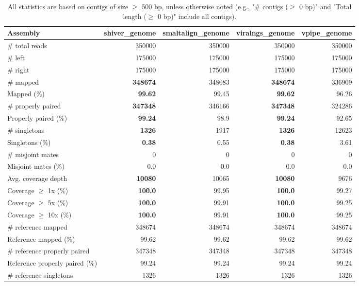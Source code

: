\documentclass[12pt,a4paper]{article}
\begin{document}
\begin{table}[ht]
\begin{center}
\caption{All statistics are based on contigs of size $\geq$ 500 bp, unless otherwise noted (e.g., "\# contigs ($\geq$ 0 bp)" and "Total length ($\geq$ 0 bp)" include all contigs).}
\begin{tabular}{|l*{4}{|r}|}
\hline
Assembly & shiver\_genome & smaltalign\_genome & viralngs\_genome & vpipe\_genome \\ \hline
\# total reads & 350000 & 350000 & 350000 & 350000 \\ \hline
\# left & 175000 & 175000 & 175000 & 175000 \\ \hline
\# right & 175000 & 175000 & 175000 & 175000 \\ \hline
\# mapped & {\bf 348674} & 348083 & {\bf 348674} & 336909 \\ \hline
Mapped (\%) & {\bf 99.62} & 99.45 & {\bf 99.62} & 96.26 \\ \hline
\# properly paired & {\bf 347348} & 346166 & {\bf 347348} & 324286 \\ \hline
Properly paired (\%) & {\bf 99.24} & 98.9 & {\bf 99.24} & 92.65 \\ \hline
\# singletons & {\bf 1326} & 1917 & {\bf 1326} & 12623 \\ \hline
Singletons (\%) & {\bf 0.38} & 0.55 & {\bf 0.38} & 3.61 \\ \hline
\# misjoint mates & 0 & 0 & 0 & 0 \\ \hline
Misjoint mates (\%) & 0.0 & 0.0 & 0.0 & 0.0 \\ \hline
Avg. coverage depth & {\bf 10080} & 10065 & {\bf 10080} & 9676 \\ \hline
Coverage $\geq$ 1x (\%) & {\bf 100.0} & 99.95 & {\bf 100.0} & 99.27 \\ \hline
Coverage $\geq$ 5x (\%) & {\bf 100.0} & 99.91 & {\bf 100.0} & 99.25 \\ \hline
Coverage $\geq$ 10x (\%) & {\bf 100.0} & 99.91 & {\bf 100.0} & 99.25 \\ \hline
\# reference mapped & 348674 & 348674 & 348674 & 348674 \\ \hline
Reference mapped (\%) & 99.62 & 99.62 & 99.62 & 99.62 \\ \hline
\# reference properly paired & 347348 & 347348 & 347348 & 347348 \\ \hline
Reference properly paired (\%) & 99.24 & 99.24 & 99.24 & 99.24 \\ \hline
\# reference singletons & 1326 & 1326 & 1326 & 1326 \\ \hline

\end{tabular}
\end{center}
\end{table}
\end{document}
